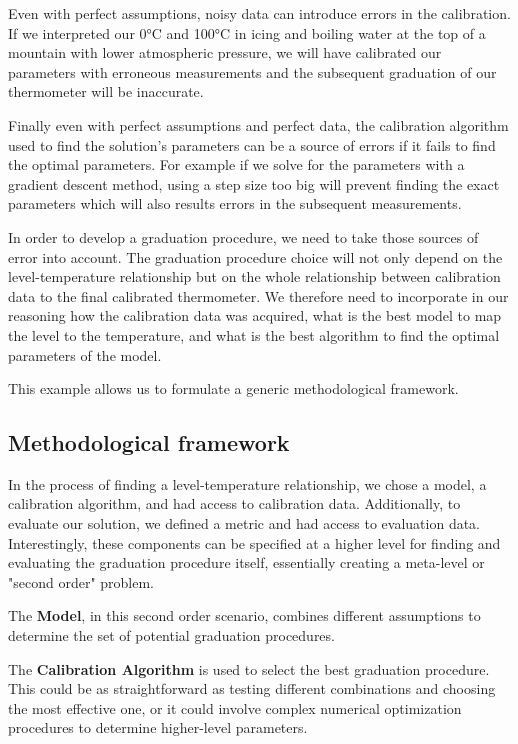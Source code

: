 \begin{bibunit}
 Even with perfect assumptions, noisy data can introduce errors in the calibration. If we interpreted our 0°C and 100°C in icing and boiling water at the top of a mountain with lower atmospheric pressure, we will have calibrated our parameters with erroneous measurements and the subsequent graduation of our thermometer will be inaccurate.

 Finally even with perfect assumptions and perfect data, the calibration algorithm used to find the solution's parameters can be a source of errors if it fails to find the optimal parameters. For example if we solve for the parameters with a gradient descent method, using a step size too big will prevent finding the exact parameters which will also results errors in the subsequent measurements.

In order to develop a graduation procedure, we need to take those sources of error into account. The graduation procedure choice will not only depend on the level-temperature relationship but on the whole relationship between calibration data to the final calibrated thermometer. We therefore need to incorporate in our reasoning how the calibration data was acquired, what is the best model to map the level to the temperature, and what is the best algorithm to find the optimal parameters of the model.


This example allows us to formulate a generic methodological framework.

\subsection*{Methodological framework}
In the process of finding a level-temperature relationship, we chose a model, a calibration algorithm, and had access to calibration data. Additionally, to evaluate our solution, we defined a metric and had access to evaluation data. Interestingly, these components can be specified at a higher level for finding and evaluating the graduation procedure itself, essentially creating a meta-level or "second order" problem.

The \textbf{Model}, in this second order scenario, combines different assumptions to determine the set of potential graduation procedures. 

The \textbf{Calibration Algorithm} is used to select the best graduation procedure. This could be as straightforward as testing different combinations and choosing the most effective one, or it could involve complex numerical optimization procedures to determine higher-level parameters.


\end{bibunit}

